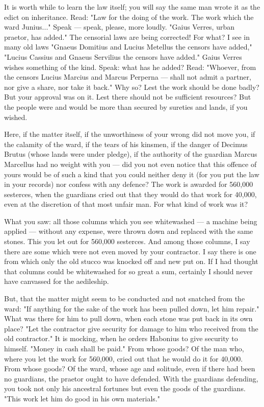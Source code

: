 It is worth while to learn the law itself; you will say the same man wrote it as the edict on inheritance. Read: "Law for the doing of the work. The work which the ward Junius..." Speak --- speak, please, more loudly. "Gaius Verres, urban praetor, has added." The censorial laws are being corrected! For what? I see in many old laws "Gnaeus Domitius and Lucius Metellus the censors have added," "Lucius Cassius and Gnaeus Servilius the censors have added." Gaius Verres wishes something of the kind. Speak: what has he added? Read: "Whoever, from the censors Lucius Marcius and Marcus Perperna --- shall not admit a partner, nor give a share, nor take it back." Why so? Lest the work should be done badly? But your approval was on it. Lest there should not be sufficient resources? But the people were and would be more than secured by sureties and lands, if you wished.

 Here, if the matter itself, if the unworthiness of your wrong did not move you, if the calamity of the ward, if the tears of his kinsmen, if the danger of Decimus Brutus (whose lands were under pledge), if the authority of the guardian Marcus Marcellus had no weight with you --- did you not even notice that this offence of yours would be of such a kind that you could neither deny it (for you put the law in your records) nor confess with any defence? The work is awarded for 560,000 sesterces, when the guardians cried out that they would do that work for 40,000, even at the discretion of that most unfair man. For what kind of work was it?

 What you saw: all those columns which you see whitewashed --- a machine being applied --- without any expense, were thrown down and replaced with the same stones. This you let out for 560,000 sesterces. And among those columns, I say there are some which were not even moved by your contractor. I say there is one from which only the old stucco was knocked off and new put on. If I had thought that columns could be whitewashed for so great a sum, certainly I should never have canvassed for the aedileship.

 But, that the matter might seem to be conducted and not snatched from the ward: "If anything for the sake of the work has been pulled down, let him repair." What was there for him to pull down, when each stone was put back in its own place? "Let the contractor give security for damage to him who received from the old contractor." It is mocking, when he orders Habonius to give security to himself. "Money in cash shall be paid." From whose goods? Of the man who, where you let the work for 560,000, cried out that he would do it for 40,000. From whose goods? Of the ward, whose age and solitude, even if there had been no guardians, the praetor ought to have defended. With the guardians defending, you took not only his ancestral fortunes but even the goods of the guardians. "This work let him do good in his own materials."


